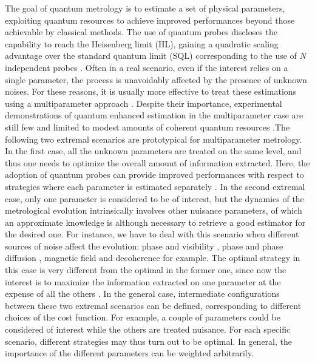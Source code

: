 \documentclass[aps,pra,twocolumn,notitlepage,superscriptaddress]{revtex4-1}
\begin{document}
\maketitle

The goal of quantum metrology is to estimate a set of physical parameters, exploiting quantum resources to achieve improved performances beyond those achievable by classical methods. The use of quantum probes discloses the capability to reach the Heisenberg limit (HL), gaining a quadratic scaling advantage over the standard quantum limit (SQL) corresponding to the use of $N$ independent probes \cite{Giovannetti1330,PhysRevLett.96.010401,Giovannetti,barbieri2022optical,avsreview2020}. Often in a real scenario, even if the interest relies on a single parameter, the process is unavoidably affected by the presence of unknown noises. For these reasons, it is usually more effective to treat these estimations using a multiparameter approach \cite{liu2019quantum,suzuki2020quantum,suzuki2020nuisance,doi:10.1080/23746149.2016.1230476,albarelli2020perspective}. Despite their importance, experimental demonstrations of quantum enhanced estimation in the multiparameter case are still few and limited to modest amounts of coherent quantum resources \cite{polino2019experimental,liu2021distributed,hong2021quantum,valeri2022experimental,cimini2022deep,avsreview2020}.The following two extremal scenarios are prototypical for multiparameter metrology. In the first case, all the unknown parameters are treated on the same level, and thus one needs to optimize the overall amount of information extracted. Here, the adoption of quantum probes can provide improved performances with respect to strategies where each parameter is estimated separately \cite{humphreys2013quantum,PhysRevLett.128.040504,belliardo2021incompatibility,Yue}. In the second extremal case, only one parameter is considered to be of interest, but the dynamics of the metrological evolution intrinsically involves other nuisance parameters, of which an approximate knowledge is although necessary to retrieve a good estimator for the desired one. For instance, we have to deal with this scenario when different sources of noise affect the evolution: phase and visibility \cite{Roccia:18,roccia2017entangling,cimini2019quantum,cimini2019adaptive}, phase and phase diffusion \cite{Vidrighin,PhysRevLett.106.153603}, magnetic field and decoherence \cite{PhysRevA.84.012103} for example. The optimal strategy in this case is very different from the optimal in the former one, since now the interest is to maximize the information extracted on one parameter at the expense of all the others \cite{goldberg2020multiphase}. In the general case, intermediate configurations between these two extremal scenarios can be defined, corresponding to different choices of the cost function. For example, a couple of parameters could be considered of interest while the others are treated nuisance. For each specific scenario, different strategies may thus turn out to be optimal. In general, the importance of the different parameters can be weighted arbitrarily.
\end{document}
